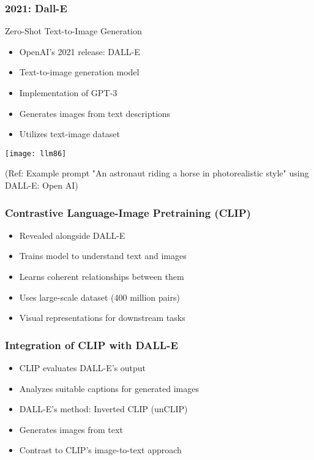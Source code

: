 \begin{frame}[fragile]\frametitle{2021: Dall-E}

 Zero-Shot Text-to-Image Generation
 
\begin{itemize}
        \item OpenAI's 2021 release: DALL-E
        \item Text-to-image generation model
        \item Implementation of GPT-3
        \item Generates images from text descriptions
        \item Utilizes text-image dataset	
\end{itemize}	

\begin{center}
\texttt{[image: llm86]}
\end{center}		

{\tiny (Ref: Example prompt "An astronaut riding a horse in photorealistic style" using DALL-E: Open AI)}

\end{frame}

\begin{frame}[fragile]\frametitle{Contrastive Language-Image Pretraining (CLIP)}
    
    \begin{itemize}
        \item Revealed alongside DALL-E
        \item Trains model to understand text and images
        \item Learns coherent relationships between them
        \item Uses large-scale dataset (400 million pairs)
        \item Visual representations for downstream tasks
    \end{itemize}
\end{frame}

\begin{frame}[fragile]\frametitle{Integration of CLIP with DALL-E}
    
    \begin{itemize}
        \item CLIP evaluates DALL-E's output
        \item Analyzes suitable captions for generated images
        \item DALL-E's method: Inverted CLIP (unCLIP)
        \item Generates images from text
        \item Contrast to CLIP's image-to-text approach
    \end{itemize}
\end{frame}

